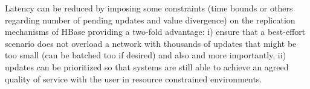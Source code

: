 Latency can be reduced by imposing some constraints (time bounds or others regarding number of pending updates and value divergence) on the replication mechanisms of HBase providing a two-fold advantage: i) ensure that a best-effort scenario does not overload a network with thousands of updates that might be too small (can be batched too if desired) and also and more importantly, ii) updates can be prioritized so that systems are still able to achieve an agreed quality of service with the user in resource constrained environments.



